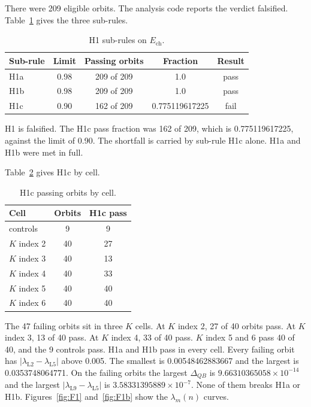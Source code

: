 \documentclass[aip,cha,reprint,amsmath,amssymb,longbibliography]{revtex4-2}
\newcommand{\sci}[2]{\ensuremath{#1\times10^{#2}}}
\newcommand{\lam}[1]{\ensuremath{\lambda_{\mathrm{#1}}}}
\newcommand{\Ech}{\ensuremath{E_{\mathrm{ch}}}}
\begin{document}
There were 209 eligible orbits.
The analysis code reports the verdict falsified.
Table~\ref{tab:h1} gives the three sub-rules.

\begin{table}
\caption{H1 sub-rules on $\Ech$.}
\label{tab:h1}
\begin{ruledtabular}
\begin{tabular}{lcccc}
Sub-rule & Limit & Passing orbits & Fraction & Result \\
\hline
H1a & 0.98 & 209 of 209 & 1.0 & pass \\
H1b & 0.98 & 209 of 209 & 1.0 & pass \\
H1c & 0.90 & 162 of 209 & 0.775119617225 & fail \\
\end{tabular}
\end{ruledtabular}
\end{table}

H1 is falsified.
The H1c pass fraction was 162 of 209, which is 0.775119617225, against the limit of 0.90.
The shortfall is carried by sub-rule H1c alone.
H1a and H1b were met in full.

Table~\ref{tab:h1cell} gives H1c by cell.

\begin{table}
\caption{H1c passing orbits by cell.}
\label{tab:h1cell}
\begin{ruledtabular}
\begin{tabular}{lcc}
Cell & Orbits & H1c pass \\
\hline
controls & 9 & 9 \\
$K$ index 2 & 40 & 27 \\
$K$ index 3 & 40 & 13 \\
$K$ index 4 & 40 & 33 \\
$K$ index 5 & 40 & 40 \\
$K$ index 6 & 40 & 40 \\
\end{tabular}
\end{ruledtabular}
\end{table}

The 47 failing orbits sit in three $K$ cells.
At $K$ index 2, 27 of 40 orbits pass.
At $K$ index 3, 13 of 40 pass.
At $K$ index 4, 33 of 40 pass.
$K$ index 5 and 6 pass 40 of 40, and the 9 controls pass.
H1a and H1b pass in every cell.
Every failing orbit has $|\lam{L2}-\lam{L5}|$ above 0.005.
The smallest is 0.00548462883667 and the largest is 0.0353748064771.
On the failing orbits the largest $\Delta_{QB}$ is \sci{9.66310365058}{-14} and the largest $|\lam{L9}-\lam{L5}|$ is \sci{3.58331395889}{-7}.
None of them breaks H1a or H1b.
Figures~\ref{fig:F1} and~\ref{fig:F1b} show the $\lambda_m(n)$ curves.
\end{document}
